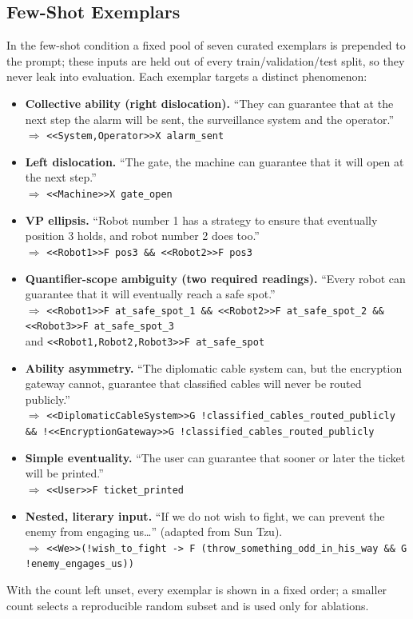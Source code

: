 \documentclass[letterpaper]{article}
\begin{document}
\subsection{Few-Shot Exemplars}
In the few-shot condition a fixed pool of seven curated exemplars is prepended to the prompt; these inputs are held out of every train/validation/test split, so they never leak into evaluation. Each exemplar targets a distinct phenomenon:
{\small\sloppy
\begin{itemize}[leftmargin=1.2em,itemsep=3pt]
  \item \textbf{Collective ability (right dislocation).} ``They can guarantee that at the next step the alarm will be sent, the surveillance system and the operator.''\\ $\Rightarrow$ \texttt{<<System,Operator>>X alarm\_sent}
  \item \textbf{Left dislocation.} ``The gate, the machine can guarantee that it will open at the next step.''\\ $\Rightarrow$ \texttt{<<Machine>>X gate\_open}
  \item \textbf{VP ellipsis.} ``Robot number 1 has a strategy to ensure that eventually position 3 holds, and robot number 2 does too.''\\ $\Rightarrow$ \texttt{<<Robot1>>F pos3 \&\& <<Robot2>>F pos3}
  \item \textbf{Quantifier-scope ambiguity (two required readings).} ``Every robot can guarantee that it will eventually reach a safe spot.''\\ $\Rightarrow$ \texttt{<<Robot1>>F at\_safe\_spot\_1 \&\& <<Robot2>>F at\_safe\_spot\_2 \&\& <<Robot3>>F at\_safe\_spot\_3}\\ and \texttt{<<Robot1,Robot2,Robot3>>F at\_safe\_spot}
  \item \textbf{Ability asymmetry.} ``The diplomatic cable system can, but the encryption gateway cannot, guarantee that classified cables will never be routed publicly.''\\ $\Rightarrow$ \texttt{<<DiplomaticCableSystem>>G !classified\_cables\_routed\_publicly \&\& !<<EncryptionGateway>>G !classified\_cables\_routed\_publicly}
  \item \textbf{Simple eventuality.} ``The user can guarantee that sooner or later the ticket will be printed.''\\ $\Rightarrow$ \texttt{<<User>>F ticket\_printed}
  \item \textbf{Nested, literary input.} ``If we do not wish to fight, we can prevent the enemy from engaging us\ldots'' (adapted from Sun Tzu).\\ $\Rightarrow$ \texttt{<<We>>(!wish\_to\_fight -> F (throw\_something\_odd\_in\_his\_way \&\& G !enemy\_engages\_us))}
\end{itemize}
}
With the count left unset, every exemplar is shown in a fixed order; a smaller count selects a reproducible random subset and is used only for ablations.
\end{document}
